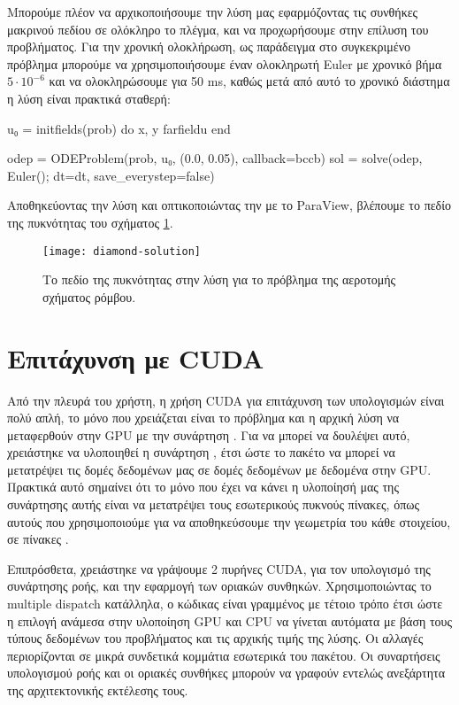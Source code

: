 Μπορούμε πλέον να αρχικοποιήσουμε την λύση μας εφαρμόζοντας τις συνθήκες μακρινού πεδίου σε ολόκληρο το πλέγμα, και να προχωρήσουμε στην επίλυση του προβλήματος. Για την χρονική ολοκλήρωση, ως παράδειγμα στο συγκεκριμένο πρόβλημα μπορούμε να χρησιμοποιήσουμε έναν ολοκληρωτή Euler με χρονικό βήμα $5 \cdot 10^{-6}$ και να ολοκληρώσουμε για 50 ms, καθώς μετά από αυτό το χρονικό διάστημα η λύση είναι πρακτικά σταθερή:

{\large
\begin{jllisting}[language=julia,style=jlcodestyle]
u₀ = initfields(prob) do x, y
	farfieldu
end

odep = ODEProblem(prob, u₀, (0.0, 0.05), callback=bccb)
sol = solve(odep, Euler(); dt=dt, save_everystep=false)
\end{jllisting}
}

Αποθηκεύοντας την λύση και οπτικοποιώντας την με το ParaView, βλέπουμε το πεδίο της πυκνότητας του σχήματος \ref{fig:diamond-solution}.

\begin{figure}[H]
    \centering
    \texttt{[image: diamond-solution]}
    \caption{Το πεδίο της πυκνότητας στην λύση για το πρόβλημα της αεροτομής σχήματος ρόμβου.}
    \label{fig:diamond-solution}
\end{figure}

\section{Επιτάχυνση με CUDA}

Από την πλευρά του χρήστη, η χρήση CUDA για επιτάχυνση των υπολογισμών είναι πολύ απλή, το μόνο που χρειάζεται είναι το πρόβλημα και η αρχική λύση να μεταφερθούν στην GPU με την συνάρτηση .
Για να μπορεί να δουλέψει αυτό, χρειάστηκε να υλοποιηθεί η συνάρτηση , έτσι ώστε το πακέτο  να μπορεί να μετατρέψει τις δομές δεδομένων μας σε δομές δεδομένων με δεδομένα στην GPU.
Πρακτικά αυτό σημαίνει ότι το μόνο που έχει να κάνει η υλοποίησή μας της συνάρτησης αυτής είναι να μετατρέψει τους εσωτερικούς πυκνούς πίνακες, όπως αυτούς που χρησιμοποιούμε για να αποθηκεύσουμε την γεωμετρία του κάθε στοιχείου, σε πίνακες .

Επιπρόσθετα, χρειάστηκε να γράψουμε 2 πυρήνες CUDA, για τον υπολογισμό της συνάρτησης ροής, και την εφαρμογή των οριακών συνθηκών.
Χρησιμοποιώντας το multiple dispatch κατάλληλα, ο κώδικας είναι γραμμένος με τέτοιο τρόπο έτσι ώστε η επιλογή ανάμεσα στην υλοποίηση GPU και CPU να γίνεται αυτόματα με βάση τους τύπους δεδομένων του προβλήματος και τις αρχικής τιμής της λύσης.
Οι αλλαγές περιορίζονται σε μικρά συνδετικά κομμάτια εσωτερικά του πακέτου.
Οι συναρτήσεις υπολογισμού ροής και οι οριακές συνθήκες μπορούν να γραφούν εντελώς ανεξάρτητα της αρχιτεκτονικής εκτέλεσης τους.

